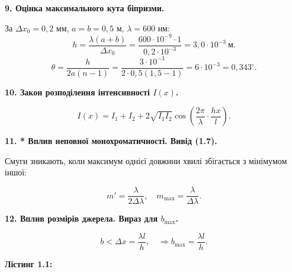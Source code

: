 \documentclass[12pt,a4paper]{article}
\begin{document}
    \vspace{1em}

    \setlength{\parindent}{0pt}

    \textbf{9. Оцінка максимального кута біпризми.}

    \setlength{\parindent}{1.5em}

    За $\Delta x_0 = 0{,}2$ мм, $a = b = 0{,}5$ м, $\lambda = 600$ нм:
    \[ h = \frac{\lambda(a+b)}{\Delta x_0} = \frac{600 \cdot 10^{-9} \cdot 1}{0{,}2 \cdot 10^{-3}} = 3{,}0 \cdot 10^{-3}\ \text{м}. \]
    \[ \theta = \frac{h}{2a(n - 1)} = \frac{3 \cdot 10^{-3}}{2 \cdot 0{,}5 (1{,}5 - 1)} = 6 \cdot 10^{-3} = 0{,}343^\circ. \]

    \vspace{1em}
    \setlength{\parindent}{0pt}

    \textbf{10. Закон розподілення інтенсивності $I(x)$.}

    \setlength{\parindent}{1.5em}

    \[ I(x) = I_1 + I_2 + 2\sqrt{I_1 I_2} \cos \left(\frac{2\pi}{\lambda} \cdot \frac{hx}{l} \right). \]

    \vspace{1em}
    \setlength{\parindent}{0pt}

    \textbf{11. * Вплив неповної монохроматичності. Вивід (1.7).}

    \setlength{\parindent}{1.5em}

    Смуги зникають, коли максимум однієї довжини хвилі збігається з мінімумом іншої:

    \[ m' = \frac{\lambda}{2\Delta\lambda}, \quad m_{\text{max}} = \frac{\lambda}{\Delta\lambda}. \]
    \vspace{1em}
    \setlength{\parindent}{0pt}

    \textbf{12. Вплив розмірів джерела. Вираз для $b_{\text{max}}$.}
    \setlength{\parindent}{1.5em}

    \[ b < \Delta x = \frac{\lambda l}{h}, \quad \Rightarrow b_{\text{max}} = \frac{\lambda l}{h}. \]

    \newpage

    \setlength{\parindent}{0pt}

    \hypertarget{listing1}{}

    \textbf{\large Лістинг 1.1:}

    \vspace{1em}
\end{document}
